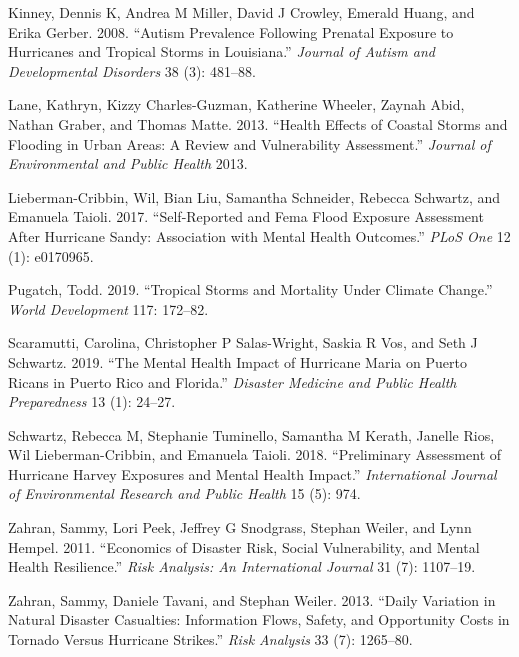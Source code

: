 \documentclass[
]{article}
\begin{document}
\leavevmode\hypertarget{ref-kinney2008autism}{}%
Kinney, Dennis K, Andrea M Miller, David J Crowley, Emerald Huang, and
Erika Gerber. 2008. ``Autism Prevalence Following Prenatal Exposure to
Hurricanes and Tropical Storms in Louisiana.'' \emph{Journal of Autism
and Developmental Disorders} 38 (3): 481--88.

\leavevmode\hypertarget{ref-lane2013health}{}%
Lane, Kathryn, Kizzy Charles-Guzman, Katherine Wheeler, Zaynah Abid,
Nathan Graber, and Thomas Matte. 2013. ``Health Effects of Coastal
Storms and Flooding in Urban Areas: A Review and Vulnerability
Assessment.'' \emph{Journal of Environmental and Public Health} 2013.

\leavevmode\hypertarget{ref-lieberman2017self}{}%
Lieberman-Cribbin, Wil, Bian Liu, Samantha Schneider, Rebecca Schwartz,
and Emanuela Taioli. 2017. ``Self-Reported and Fema Flood Exposure
Assessment After Hurricane Sandy: Association with Mental Health
Outcomes.'' \emph{PLoS One} 12 (1): e0170965.

\leavevmode\hypertarget{ref-pugatch2019tropical}{}%
Pugatch, Todd. 2019. ``Tropical Storms and Mortality Under Climate
Change.'' \emph{World Development} 117: 172--82.

\leavevmode\hypertarget{ref-scaramutti2019mental}{}%
Scaramutti, Carolina, Christopher P Salas-Wright, Saskia R Vos, and Seth
J Schwartz. 2019. ``The Mental Health Impact of Hurricane Maria on
Puerto Ricans in Puerto Rico and Florida.'' \emph{Disaster Medicine and
Public Health Preparedness} 13 (1): 24--27.

\leavevmode\hypertarget{ref-schwartz2018preliminary}{}%
Schwartz, Rebecca M, Stephanie Tuminello, Samantha M Kerath, Janelle
Rios, Wil Lieberman-Cribbin, and Emanuela Taioli. 2018. ``Preliminary
Assessment of Hurricane Harvey Exposures and Mental Health Impact.''
\emph{International Journal of Environmental Research and Public Health}
15 (5): 974.

\leavevmode\hypertarget{ref-zahran2011economics}{}%
Zahran, Sammy, Lori Peek, Jeffrey G Snodgrass, Stephan Weiler, and Lynn
Hempel. 2011. ``Economics of Disaster Risk, Social Vulnerability, and
Mental Health Resilience.'' \emph{Risk Analysis: An International
Journal} 31 (7): 1107--19.

\leavevmode\hypertarget{ref-zahran2013daily}{}%
Zahran, Sammy, Daniele Tavani, and Stephan Weiler. 2013. ``Daily
Variation in Natural Disaster Casualties: Information Flows, Safety, and
Opportunity Costs in Tornado Versus Hurricane Strikes.'' \emph{Risk
Analysis} 33 (7): 1265--80.
\end{document}
